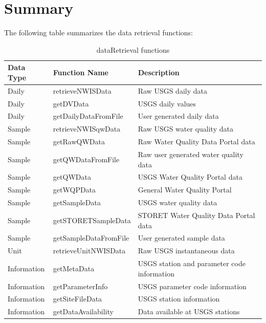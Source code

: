 \documentclass[a4paper,11pt]{article}\usepackage[]{graphicx}\usepackage[]{color}
\begin{document}
\clearpage

\section{Summary}

The following table summarizes the data retrieval functions:

\begin{table}[!ht]
\begin{minipage}{\linewidth}
\begin{center}
\caption{dataRetrieval functions} 
\begin{tabular}{lll}
  \hline
Data Type & Function Name & Description \\ 
  \hline
  Daily & retrieveNWISData & Raw USGS daily data \\
  Daily\footnotemark[1] & getDVData & USGS daily values \\
  Daily\footnotemark[1] & getDailyDataFromFile & User generated daily data \\
  Sample & retrieveNWISqwData & Raw USGS water quality data \\
  Sample & getRawQWData & Raw Water Quality Data Portal data \\
  Sample & getQWDataFromFile & Raw user generated water quality data \\
  Sample & getQWData & USGS Water Quality Portal data \\
  Sample & getWQPData & General Water Quality Portal\\
  Sample\footnotemark[1] & getSampleData & USGS water quality data\\  
  Sample\footnotemark[1] & getSTORETSampleData & STORET Water Quality Data Portal data \\
  Sample\footnotemark[1] & getSampleDataFromFile & User generated sample data \\
  Unit & retrieveUnitNWISData & Raw USGS instantaneous data \\  
  Information\footnotemark[1] & getMetaData & USGS station and parameter code information \\
  Information & getParameterInfo & USGS parameter code information \\
  Information & getSiteFileData & USGS station information \\
  Information & getDataAvailability & Data available at USGS stations \\
   \hline
\end{tabular}
\end{center}
\end{minipage}
\end{table}
\end{document}
